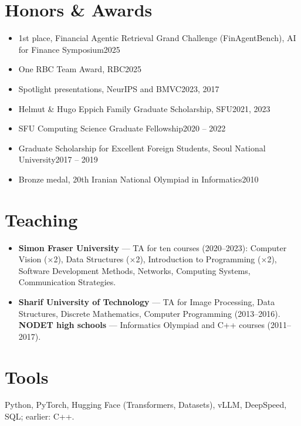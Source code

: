 \documentclass[10pt,letterpaper]{article}
\newcommand{\meta}[1]{{\ttfamily\footnotesize\color{faint}#1}}   %
\newcommand{\dates}[1]{\hfill\meta{#1}}
\begin{document}
\section{Honors \& Awards}
\begin{itemize}
  \item 1st place, Financial Agentic Retrieval Grand Challenge (FinAgentBench), AI for Finance Symposium\dates{2025}
  \item One RBC Team Award, RBC\dates{2025}
  \item Spotlight presentations, NeurIPS and BMVC\dates{2023, 2017}
  \item Helmut \& Hugo Eppich Family Graduate Scholarship, SFU\dates{2021, 2023}
  \item SFU Computing Science Graduate Fellowship\dates{2020 -- 2022}
  \item Graduate Scholarship for Excellent Foreign Students, Seoul National University\dates{2017 -- 2019}
  \item Bronze medal, 20th Iranian National Olympiad in Informatics\dates{2010}
\end{itemize}

\section{Teaching}
\begin{itemize}
  \item \textbf{Simon Fraser University} — TA for ten courses (2020--2023): Computer Vision ($\times$2), Data Structures ($\times$2), Introduction to Programming ($\times$2), Software Development Methods, Networks, Computing Systems, Communication Strategies.
  \item \textbf{Sharif University of Technology} — TA for Image Processing, Data Structures, Discrete Mathematics, Computer Programming (2013--2016). \textbf{NODET high schools} — Informatics Olympiad and C++ courses (2011--2017).
\end{itemize}

\section{Tools}
Python, PyTorch, Hugging Face (Transformers, Datasets), vLLM, DeepSpeed, SQL; earlier: C++.
\end{document}
